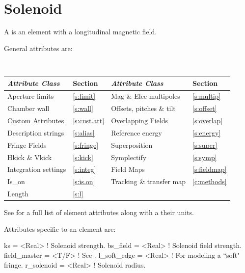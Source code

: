 {\newpage

\section{Solenoid}
\label{s:sol}

A  is an element with a longitudinal magnetic field.

General  attributes are:
\begin{center}
\tt
\begin{tabular}{llll} \toprule
  {\sl Attribute Class}      & Section           & {\sl Attribute Class}      & Section            \\ \midrule
  Aperture limits            & \ref{s:limit}     & Mag \& Elec multipoles     & \ref{s:multip}     \\
  Chamber wall               & \ref{s:wall}      & Offsets, pitches \& tilt   & \ref{s:offset}     \\
  Custom Attributes          & \ref{s:cust.att}  & Overlapping Fields         & \ref{s:overlap}    \\
  Description strings        & \ref{s:alias}     & Reference energy           & \ref{s:energy}     \\ 
  Fringe Fields              & \ref{s:fringe}    & Superposition              & \ref{s:super}      \\
  Hkick \& Vkick             & \ref{s:kick}      & Symplectify                & \ref{s:symp}       \\
  Integration settings       & \ref{s:integ}     & Field Maps                 & \ref{s:fieldmap}   \\
  Is_on                      & \ref{s:is.on}     & Tracking \& transfer map   & \ref{c:methods}    \\ 
  Length                     & \ref{s:l}         &                            &                    \\ 
  \bottomrule
\end{tabular}
\end{center}
\toffset
See  for a full list of element attributes along with a their units.

Attributes specific to an  element are:
\begin{example}
  ks           = <Real>  ! Solenoid strength.
  bs_field     = <Real>  ! Solenoid field strength.
  field_master = <T/F>   ! See .
  l_soft_edge  = <Real>  ! For modeling a ``soft" fringe.
  r_solenoid   = <Real>  ! Solenoid radius.
\end{example}

}
